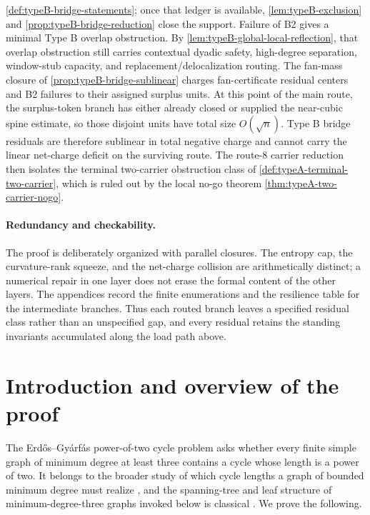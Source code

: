 \documentclass[11pt]{article}
\begin{document}
\cref{def:typeB-bridge-statements}; once that ledger is available,
\cref{lem:typeB-exclusion} and \cref{prop:typeB-bridge-reduction} close the
support.  Failure of B2 gives a minimal Type B overlap obstruction.  By
\cref{lem:typeB-global-local-reflection}, that overlap obstruction still carries
contextual dyadic safety, high-degree separation, window-stub capacity, and
replacement/delocalization routing.  The fan-mass closure of
\cref{prop:typeB-bridge-sublinear} charges fan-certificate residual centers and
B2 failures to their assigned surplus units.  At this point of the main route,
the surplus-token branch has either already closed or supplied the near-cubic
spine estimate, so those disjoint units have total size \(O(\sqrt n)\).  Type B
bridge residuals are therefore sublinear in total negative charge and cannot
carry the linear net-charge deficit on the surviving route.  The route-8 carrier
reduction then isolates the terminal two-carrier obstruction class of
\cref{def:typeA-terminal-two-carrier}, which is ruled out by the local no-go
theorem \cref{thm:typeA-two-carrier-nogo}.

\paragraph{Redundancy and checkability.}
The proof is deliberately organized with parallel closures.  The entropy cap,
the curvature-rank squeeze, and the net-charge collision are arithmetically
distinct; a numerical repair in one layer does not erase the formal content of
the other layers.  The appendices record the finite enumerations and the
resilience table for the intermediate branches.  Thus each routed branch leaves
a specified residual class rather than an unspecified gap, and every residual
retains the standing invariants accumulated along the load path above.


\section{Introduction and overview of the proof}\label{sec:intro}

The Erd\H{o}s--Gy\'arf\'as power-of-two cycle problem asks whether every finite simple graph of minimum degree at least three contains a cycle whose length is a power of two.  It belongs to the broader study of which cycle lengths a graph of bounded minimum degree must realize \cite{BondyVince,GaoMa}, and the spanning-tree and leaf structure of minimum-degree-three graphs invoked below is classical \cite{KleitmanWest}.  We prove the following.
\end{document}
